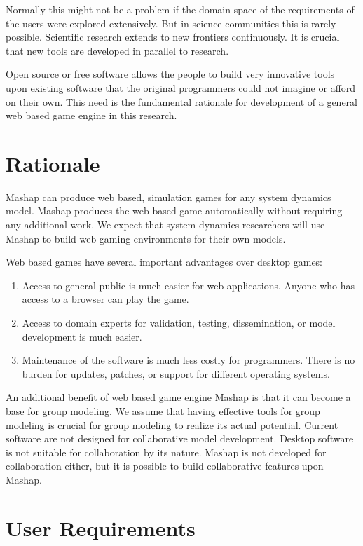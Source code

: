 \documentclass[12pt,a4paper]{paper}
\begin{document}
Normally this might not be a problem if the domain space of the requirements of the users were explored extensively. But in science communities this is rarely possible. Scientific research extends to new frontiers continuously. It is crucial that new tools are developed in parallel to research.

Open source or free software allows the people to build very innovative tools upon existing software that the original programmers could not imagine or afford on their own. This need is the fundamental rationale for development of a general web based game engine in this research.
	
\section{Rationale}

Mashap can produce web based, simulation games for any system dynamics model. Mashap produces the web based game automatically without requiring any additional work. We expect that system dynamics researchers will use Mashap to build web gaming environments for their own models.

Web based games have several important advantages over desktop games:

\begin{enumerate}
	\item Access to general public is much easier for web applications. Anyone who has access to a browser can play the game.
	\item Access to domain experts for validation, testing, dissemination, or model development is much easier.
	\item Maintenance of the software is much less costly for programmers. There is no burden for updates, patches, or support for different operating systems.
\end{enumerate}

An additional benefit of web based game engine Mashap is that it can become a base for group modeling. We assume that having effective tools for group modeling is crucial for group modeling to realize its actual potential. Current software are not designed for collaborative model development. Desktop software is not suitable for collaboration by its nature. Mashap is not developed for collaboration either, but it is possible to build collaborative features upon Mashap.

\section{User Requirements}
\end{document}
